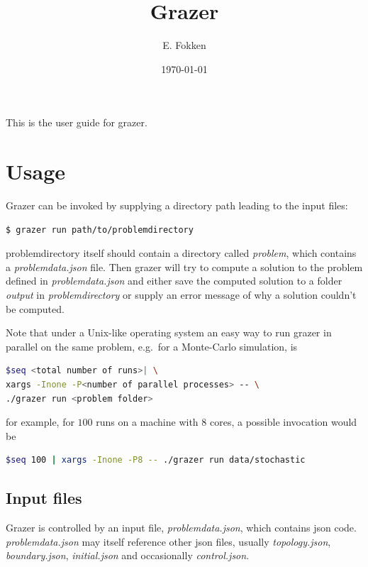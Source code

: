 \documentclass[a4paper]{article}
\title{Grazer}
\author{E. Fokken}
\date{\today}
\newcommand{\sco
}{\textunderscore{}}
\begin{document}
\maketitle
{}

This is the user guide for grazer.

\section{Usage}
\label{sec:usage} Grazer can be invoked by supplying a directory path leading to the input files:
\begin{lstlisting}[language=bash,firstnumber=1] 
$ grazer run path/to/problemdirectory 
\end{lstlisting}
problemdirectory itself should contain a directory called \emph{problem}, which
contains a \emph{problem\sco data.json} file. Then grazer will try to compute a
solution to the problem defined in \emph{problem\sco data.json} and either save
the computed solution to a folder \emph{output} in \emph{problemdirectory} or
supply an error message of why a solution couldn't be computed.


Note that under a Unix-like operating system an easy way to run grazer in
parallel on the same problem, e.g.~for a Monte-Carlo simulation, is
\begin{lstlisting}[language=bash,basicstyle=\small\ttfamily]
$seq <total number of runs>| \
xargs -Inone -P<number of parallel processes> -- \
./grazer run <problem folder>
\end{lstlisting}
for example, for \(100\) runs on a machine with \(8\) cores, a possible invocation would be
\begin{lstlisting}[language=bash,basicstyle=\small\ttfamily]
$seq 100 | xargs -Inone -P8 -- ./grazer run data/stochastic
\end{lstlisting}



\subsection{Input files}
\label{sec:input-files}
Grazer is controlled by an input file, \emph{problem\sco data.json}, which
contains json code. \emph{problem\sco data.json} may itself reference other json
files, usually \emph{topology.json}, \emph{boundary.json}, \emph{initial.json}
and occasionally \emph{control.json}.
\end{document}
